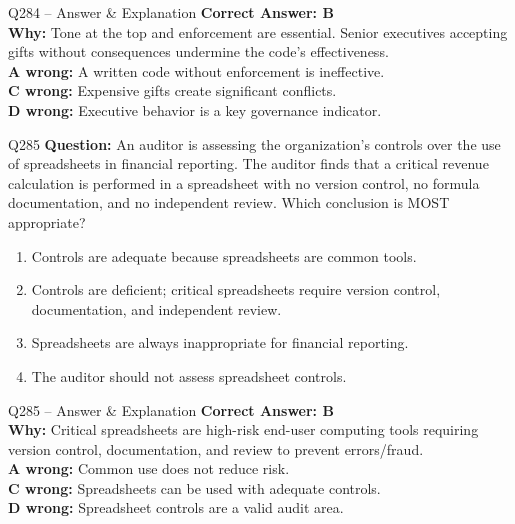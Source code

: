 \documentclass[aspectratio=169,10pt]{beamer}
\begin{document}
	\begin{frame}[t]{Q284 -- Answer \& Explanation}
		\small
		\textbf{Correct Answer: B} \\[4pt]
		\textbf{Why:} Tone at the top and enforcement are essential. Senior executives accepting gifts without consequences undermine the code's effectiveness. \\[4pt]
		\textbf{A wrong:} A written code without enforcement is ineffective. \\[2pt]
		\textbf{C wrong:} Expensive gifts create significant conflicts. \\[2pt]
		\textbf{D wrong:} Executive behavior is a key governance indicator.
	\end{frame}
	
	\begin{frame}[t]{Q285}
		\small
		\textbf{Question:} An auditor is assessing the organization's controls over the use of spreadsheets in financial reporting. The auditor finds that a critical revenue calculation is performed in a spreadsheet with no version control, no formula documentation, and no independent review. Which conclusion is MOST appropriate?
		\begin{enumerate}[label=\Alph*.,itemsep=1pt,topsep=2pt]
			\item Controls are adequate because spreadsheets are common tools.
			\item Controls are deficient; critical spreadsheets require version control, documentation, and independent review.
			\item Spreadsheets are always inappropriate for financial reporting.
			\item The auditor should not assess spreadsheet controls.
		\end{enumerate}
	\end{frame}
	
	\begin{frame}[t]{Q285 -- Answer \& Explanation}
		\small
		\textbf{Correct Answer: B} \\[4pt]
		\textbf{Why:} Critical spreadsheets are high-risk end-user computing tools requiring version control, documentation, and review to prevent errors/fraud. \\[4pt]
		\textbf{A wrong:} Common use does not reduce risk. \\[2pt]
		\textbf{C wrong:} Spreadsheets can be used with adequate controls. \\[2pt]
		\textbf{D wrong:} Spreadsheet controls are a valid audit area.
	\end{frame}
	
\end{document}

